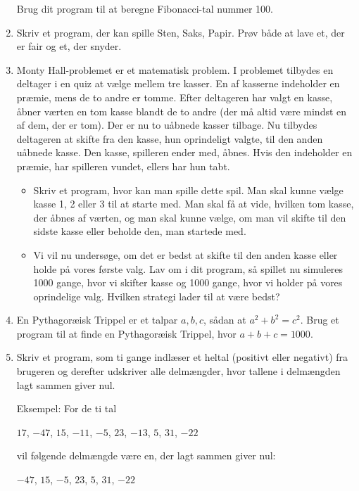 \documentclass[12pt]{article}
\begin{document}
\begin{enumerate}
Brug dit program til at beregne Fibonacci-tal nummer 100.

\item Skriv et program, der kan spille Sten, Saks, Papir. Prøv både at lave et, der
er fair og et, der snyder.

\item Monty Hall-problemet er et matematisk problem. I problemet tilbydes en deltager i en quiz at vælge
mellem tre kasser. En af kasserne indeholder en præmie, mens de to andre er tomme. Efter deltageren har valgt en kasse, åbner værten en tom kasse blandt de to andre (der må altid være mindst en af dem, der er tom). Der er nu to uåbnede kasser tilbage.
Nu tilbydes deltageren at skifte fra den kasse, hun oprindeligt valgte, til den anden uåbnede kasse.
Den kasse, spilleren ender med, åbnes. Hvis den indeholder en præmie, har spilleren vundet, ellers har hun tabt.
\begin{itemize}
\item Skriv et program, hvor kan man spille dette spil. Man skal kunne vælge kasse 1, 2 eller 3 til at starte med. Man skal få at vide, hvilken tom kasse, der åbnes af værten, og man skal kunne vælge, om man vil skifte til den sidste kasse eller beholde den, man startede med.
\item Vi vil nu undersøge, om det er bedst at skifte til den anden kasse eller holde på vores første valg. Lav om i dit program, så spillet nu simuleres 1000 gange, hvor vi skifter kasse og 1000 gange, hvor vi holder på vores oprindelige valg. Hvilken strategi lader til at være bedst?
\end{itemize}

\item
En Pythagoræisk Trippel er et talpar $a,b,c$, sådan at $a^2+b^2=c^2$.
Brug et program til at finde en Pythagoræisk Trippel, hvor $a+b+c=1000$.


\item Skriv et program, som ti gange indlæser et heltal
(positivt eller negativt) fra brugeren og derefter udskriver alle
delmængder, hvor tallene i delmængden lagt sammen giver nul.

Eksempel: For de ti tal

\medskip
\centerline{$17$, $-47$, $15$, $-11$, $-5$, $23$, $-13$, $5$, $31$, $-22$}
\medskip

vil følgende delmængde være en, der lagt sammen giver nul:

\medskip
\centerline{$-47$, $15$, $-5$, $23$, $5$, $31$, $-22$}
\medskip

\end{enumerate}
\end{document}
